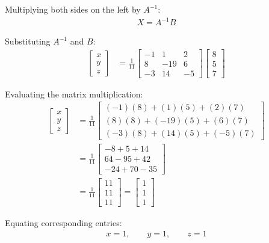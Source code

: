 \begin{enumerate}[label=\thesubsection.\arabic*, ref=\thesubsection.\theenumi]
Multiplying both sides on the left by $A^{-1}$:
\begin{align*}
	X = A^{-1}B
\end{align*}

Substituting $A^{-1}$ and $B$:
\begin{align*}
	\begin{bmatrix}
		x \\
		y \\
		z
	\end{bmatrix}
	&= \frac{1}{11}
	\begin{bmatrix}
		-1 & 1 & 2 \\
		8 & -19 & 6 \\
		-3 & 14 & -5
	\end{bmatrix}
	\begin{bmatrix}
		8 \\
		5 \\
		7
	\end{bmatrix}
\end{align*}

Evaluating the matrix multiplication:
\begin{align*}
	\begin{bmatrix}
		x \\
		y \\
		z
	\end{bmatrix}
	&= \frac{1}{11}
	\begin{bmatrix}
		(-1)(8) + (1)(5) + (2)(7) \\
		(8)(8) + (-19)(5) + (6)(7) \\
		(-3)(8) + (14)(5) + (-5)(7)
	\end{bmatrix} \\
	&= \frac{1}{11}
	\begin{bmatrix}
		-8 + 5 + 14 \\
		64 - 95 + 42 \\
		-24 + 70 - 35
	\end{bmatrix} \\
	&= \frac{1}{11}
	\begin{bmatrix}
		11 \\
		11 \\
		11
	\end{bmatrix}
	=
	\begin{bmatrix}
		1 \\
		1 \\
		1
	\end{bmatrix}
\end{align*}

Equating corresponding entries:
\begin{align*}
	x = 1, \qquad y = 1, \qquad z = 1
\end{align*}


\end{enumerate}
